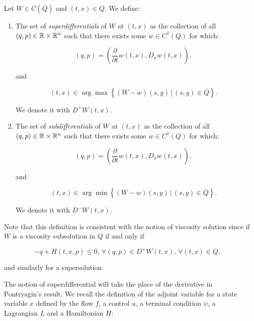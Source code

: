 \begin{definition}
    Let $W\in C(\overline{Q})$ and $(t,x)\in Q$. We define:

    \begin{enumerate}
        \item The set of \textit{superdifferentials} of $W$ at $(t,x)$ as the collection of all $(q,p)\in\mathbb{R}\times\mathbb{R}^n$ such that 
        there exists some $w\in C^1(Q)$ for which:
        
        \begin{equation}
            (q,p) = \left(\frac{\partial}{\partial t}w(t,x),D_x w(t,x)\right),
        \end{equation}

        and

        \begin{equation}
            (t,x) \in \arg \max \left\{(W-w)(s,y)\,|\,(s,y)\in\overline{Q}\right\}.
        \end{equation}

        We denote it with $D^+W(t,x)$.

        \item The set of \textit{subdifferentials} of $W$ at $(t,x)$ as the collection of all $(q,p)\in\mathbb{R}\times\mathbb{R}^n$ such that 
        there exists some $w\in C^1(Q)$ for which:
        
        \begin{equation}
            (q,p) = \left(\frac{\partial}{\partial t}w(t,x),D_x w(t,x)\right),
        \end{equation}

        and

        \begin{equation}
            (t,x) \in \arg \min \left\{(W-w)(s,y)\,|\,(s,y)\in\overline{Q}\right\}.
        \end{equation}

        We denote it with $D^-W(t,x)$.
    \end{enumerate}
\end{definition}

Note that this definition is consistent with the notion of viscosity solution since if $W$ is a viscosity subsolution in $Q$ 
if and only if 

\[-q+H(t,x,p)\leq 0,\,\forall (q,p)\in D^+W(t,x),\,\forall(t,x)\in Q,\]

and similarly for a supersolution.

The notion of superdifferential will take the place of the derivative in Pontryagin's result. We recall the definition of the adjoint variable for a state variable $x$ defined by the flow $f$, a control $u$, 
a terminal condition $\psi$, a Lagrangian $L$ and a Hamiltonian $H$:

